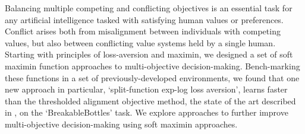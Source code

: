
Balancing multiple competing and conflicting objectives is an essential task for any artificial intelligence tasked with satisfying human values or preferences. Conflict arises both from misalignment between individuals with competing values, but also between conflicting value systems held by a single human. Starting with principles of loss-aversion and maximin, we designed a set of soft maximin function approaches to multi-objective decision-making. Bench-marking these functions in a set of previously-developed environments, we found that one new approach in particular, `split-function exp-log loss aversion', learns faster than the thresholded alignment objective method, the state of the art described in \cite{vamplew_potential-based_2021}, on the `BreakableBottles' task. We explore approaches to further improve multi-objective decision-making using soft maximin approaches.

